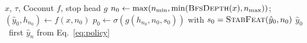 \vspace{-2pt}
\begin{minipage}{\linewidth}
\label{alg:cf}
\scriptsize
\begin{algorithmic}[1]
\Require $x$, $\tau$, Coconut $f$, stop head $g$
\State $n_0 \leftarrow \max(n_{\min},\min(\textsc{BfsDepth}(x),n_{\max}))$;\ $(\hat y_0,h_{n_0}) \leftarrow f(x,n_0)$
\State $p_0 \leftarrow \sigma(g(h_{n_0},n_0,s_0))$ with $s_0=\textsc{StabFeat}(\hat y_0,n_0)$
 \Return $\hat y_0$ \Else\ \Return first $\hat y_n$ from Eq.~\eqref{eq:policy} \EndIf
\end{algorithmic}
\end{minipage}
\vspace{-4pt}
